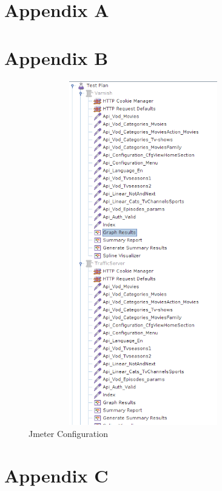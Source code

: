\begin{appendices}

\chapter{Appendix A}
	 \lstset{basicstyle=\footnotesize\ttfamily}
	 

\chapter{Appendix B}
	 
	\begin{figure}[h]
    	\centering
		\includegraphics[width=10cm,height=15cm,keepaspectratio]{images/jmeter_conf.png}
    	\caption{Jmeter Configuration}
    	\label{fig:jmeter_conf}
	\end{figure}

\chapter{Appendix C}
	 \lstset{basicstyle=\footnotesize\ttfamily}
	 



\end{appendices}
